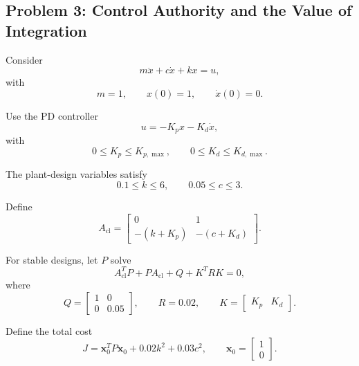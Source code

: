 \subsection*{Problem 3: Control Authority and the Value of Integration}

Consider
\begin{equation}
m\ddot{x}+c\dot{x}+kx=u,
\end{equation}
with
\begin{equation}
m=1,
\qquad
x(0)=1,
\qquad
\dot{x}(0)=0.
\end{equation}

Use the PD controller
\begin{equation}
u=-K_px-K_d\dot{x},
\end{equation}
with
\begin{equation}
0\leq K_p\leq K_{p,\max},
\qquad
0\leq K_d\leq K_{d,\max}.
\end{equation}

The plant-design variables satisfy
\begin{equation}
0.1\leq k\leq6,
\qquad
0.05\leq c\leq3.
\end{equation}

Define
\begin{equation}
A_{\mathrm{cl}}
=
\begin{bmatrix}
0&1\\
-(k+K_p)&-(c+K_d)
\end{bmatrix}.
\end{equation}

For stable designs, let $P$ solve
\begin{equation}
A_{\mathrm{cl}}^TP
+
PA_{\mathrm{cl}}
+
Q
+
K^TRK
=
0,
\end{equation}
where
\begin{equation}
Q=
\begin{bmatrix}
1&0\\
0&0.05
\end{bmatrix},
\qquad
R=0.02,
\qquad
K=
\begin{bmatrix}
K_p&K_d
\end{bmatrix}.
\end{equation}

Define the total cost
\begin{equation}
J
=
\mathbf{x}_0^TP\mathbf{x}_0
+
0.02k^2
+
0.03c^2,
\qquad
\mathbf{x}_0=
\begin{bmatrix}
1\\0
\end{bmatrix}.
\end{equation}

